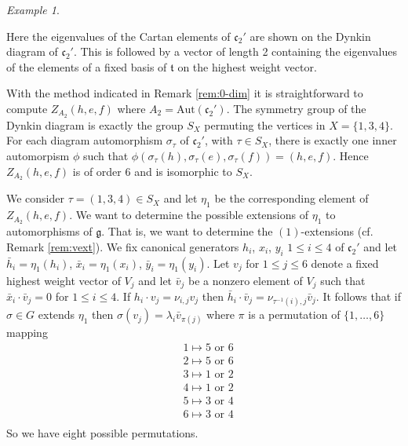 \documentclass[a4paper,10pt]{amsart}
\newcommand{\mf}{\mathfrak}
\newcommand{\g}{\mf{g}}
\renewcommand{\c}{\mf{c}}
\newcommand{\ttt}{\mf{t}}
\newcommand{\Aut}{\mathrm{Aut}}
\numberwithin{equation}{section}
\theoremstyle{remark}
\theoremstyle{remark}
\newtheorem{example}[theorem]{Example}
\begin{document}
\begin{example}
\begin{center}
\end{center}

Here the eigenvalues of the Cartan elements of $\c_2'$ are shown on the
Dynkin diagram of $\c_2'$. This is followed by a vector of length 2 containing
the eigenvalues of the elements of a fixed basis of $\ttt$ on the highest
weight vector. 

With the method indicated in Remark \ref{rem:0-dim}
it is straightforward to compute $Z_{A_2}(h,e,f)$ where $A_2=\Aut(\c_2')$.
The symmetry group of the Dynkin diagram is exactly the group $S_X$ permuting
the vertices in $X=\{1,3,4\}$. For each diagram automorphism $\sigma_\tau$
of $\c_2'$, with $\tau\in S_X$, there is exactly one inner automorpism
$\phi$ such that $\phi (\sigma_\tau(h),\sigma_\tau(e),\sigma_\tau(f))=(h,e,f)$.
Hence $Z_{A_2}(h,e,f)$ is of order 6 and is isomorphic to $S_X$.

We consider $\tau=(1,3,4)\in S_X$ and let $\eta_1$ be the corresponding
element of $Z_{A_2}(h,e,f)$. We want to determine the possible extensions of
$\eta_1$ to automorphisms of $\g$. That is, we want to determine the
$(1)$-extensions (cf. Remark \ref{rem:vext}). 
We fix canonical generators $h_i$, $x_i$, $y_i$
$1\leq i\leq 4$ of $\c_2'$ and let $\bar h_i = \eta_1(h_i)$,  $\bar x_i =
\eta_1(x_i)$,  $\bar y_i = \eta_1(y_i)$. Let $v_j$ for $1\leq j\leq 6$ denote
a fixed highest weight vector of $V_j$ and let $\bar v_j$ be a nonzero element
of $V_j$ such that $\bar x_i \cdot \bar v_j=0$ for $1\leq i\leq 4$. If
$h_i \cdot v_j = \nu_{i,j} v_j$ then $\bar h_i \cdot \bar v_j = \nu_{\tau^{-1}(i),j}
\bar v_j$. It follows that if $\sigma\in G$ extends $\eta_1$ then
$\sigma(v_j) = \lambda_i \bar v_{\pi(j)}$ where $\pi$ is a permutation of
$\{1,\ldots,6\}$ mapping
\begin{align*}
& 1\mapsto 5 \text{ or } 6\\
& 2\mapsto 5 \text{ or } 6\\
& 3\mapsto 1 \text{ or } 2\\
& 4\mapsto 1 \text{ or } 2\\
& 5\mapsto 3 \text{ or } 4\\
& 6\mapsto 3 \text{ or } 4\\
\end{align*}
So we have eight possible permutations.


\end{example}
\end{document}
